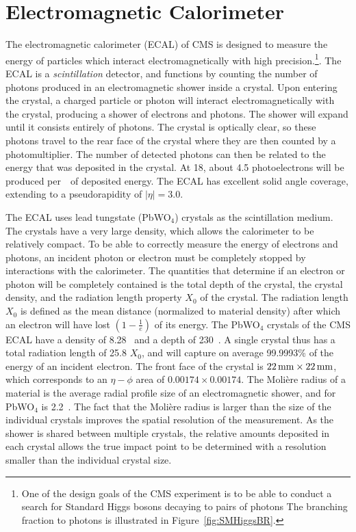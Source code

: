 \section{Electromagnetic Calorimeter}
The electromagnetic calorimeter (ECAL) of CMS is designed to measure the energy
of particles which interact electromagnetically with high
precision.\footnote{One of the design goals of the CMS experiment is to be able
to conduct a search for Standard Higgs bosons decaying to pairs of photons The
branching fraction to photons is illustrated in Figure~\ref{fig:SMHiggsBR}.}.
The ECAL is a \emph{scintillation} detector, and functions by counting the
number of photons produced in an electromagnetic shower inside a crystal.  Upon
entering the crystal, a charged particle or photon will interact
electromagnetically with the crystal, producing a shower of electrons and
photons. The shower will expand until it consists entirely of photons.  The
crystal is optically clear, so these photons travel to the rear face of the
crystal where they are then counted by a photomultiplier.  The number of
detected photons can then be related to the energy that was deposited in the
crystal.  At 18\celsius, about 4.5 photoelectrons will be produced
per~\mega\electronvolt~of deposited energy.  The ECAL has excellent solid angle
coverage, extending to a pseudorapidity of $|\eta| = 3.0$.

The ECAL uses lead tungstate (PbWO$_4$) crystals as the scintillation medium.
The crystals have a very large density, which allows the calorimeter to be
relatively compact.  To be able to correctly measure the energy of electrons and
photons, an incident photon or electron must be completely stopped by
interactions with the calorimeter.  The quantities that determine if an electron
or photon will be completely contained is the total depth of the crystal, the
crystal density, and the radiation length property $X_0$ of the crystal.  The
radiation length $X_0$ is defined as the mean distance (normalized to material
density) after which an electron will have lost $(1-\frac{1}{e})$ of its energy.
The PbWO$_4$ crystals of the CMS ECAL have a density of
8.28~\gram\per\square{\centi\meter} and a depth of 230~\mm.  A single crystal
thus has a total radiation length of 25.8 $X_0$, and will capture on average
99.9993\% of the energy of an incident electron.  The front face of the crystal
is $22\,\text{mm} \times 22\,\text{mm}$, which corresponds to an $\eta-\phi$ area of $0.00174
\times 0.00174$.  The Moli\`{e}re radius of a material is the average radial
profile size of an electromagnetic shower, and for PbWO$_4$ is 2.2~\centi\meter.
The fact that the Moli\`{e}re radius is larger than the size of the individual
crystals improves the spatial resolution of the measurement.  As the shower is
shared between multiple crystals, the relative amounts deposited in each crystal
allows the true impact point to be determined with a resolution smaller than the
individual crystal size.

